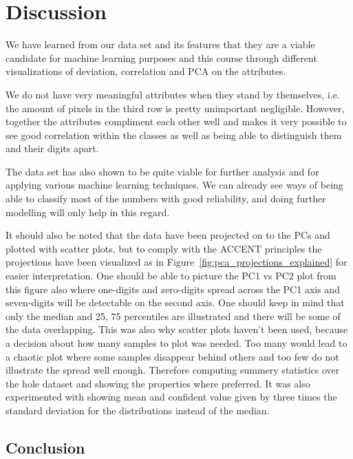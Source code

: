 \chapter{Discussion}
We have learned from our data set and its features that they are a viable candidate for machine learning purposes and this course through different visualizations of deviation, correlation and PCA on the attributes. 

We do not have very meaningful attributes when they stand by themselves, i.e. the amount of pixels in the third row is pretty unimportant negligible. However, together the attributes compliment each other well and makes it very possible to see good correlation within the classes as well as being able to distinguish them and their digits apart.

The data set has also shown to be quite viable for further analysis and for applying various machine learning techniques. We can already see ways of being able to classify most of the numbers with good reliability, and doing further modelling will only help in this regard.

It should also be noted that the data have been projected on to the PCs and plotted with scatter plots, but to comply with the ACCENT principles the projections have been visualized as in Figure~\ref{fig:pca_projections_explained} for easier interpretation. One should be able to picture the PC1 vs PC2 plot from this figure also where one-digits and zero-digits spread across the PC1 axis and seven-digits will be detectable on the second axis.  
One should keep in mind that only the median and 25, 75 percentiles are illustrated and there will be some of the data overlapping. This was also why scatter plots haven’t been used, because a decision about how many samples to plot was needed. Too many would lead to a chaotic plot where some samples disappear behind others and too few do not illustrate the spread well enough. Therefore computing summery statistics over the hole dataset and showing the properties where preferred. It was also experimented with showing mean and confident value given by three times the standard deviation for the distributions instead of the median.
 
\section{Conclusion}
